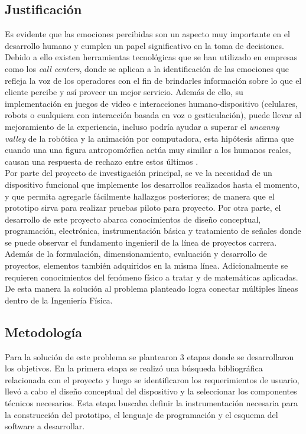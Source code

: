 \documentclass[11pt,lettersize]{article} %
\begin{document}
\subsection{Justificación}
Es evidente que las emociones percibidas son un aspecto muy importante en el desarrollo humano y cumplen un papel significativo en la toma de decisiones. Debido a ello existen herramientas tecnológicas que se han utilizado en empresas como los \textit{call centers}, donde se aplican a la identificación de las emociones que refleja la voz de los operadores con el fin de brindarles información sobre lo que el cliente percibe y así proveer un mejor servicio. Además de ello, su implementación en juegos de video e interacciones humano-dispositivo (celulares, robots o cualquiera con interacción basada en voz o gesticulación), puede llevar al mejoramiento de la experiencia, incluso podría ayudar a superar el \textit{uncanny valley} de la robótica y la animación por computadora, esta hipótesis afirma que cuando una una figura antropomórfica actúa muy similar a los humanos reales, causan una respuesta de rechazo entre estos últimos \cite{Woods2004}. \\

Por parte del proyecto de investigación principal, se ve la necesidad de un dispositivo funcional que implemente los desarrollos realizados hasta el momento, y que permita agregarle fácilmente hallazgos posteriores; de manera que el prototipo sirva para realizar pruebas piloto para proyecto. Por otra parte, el desarrollo de este proyecto abarca conocimientos de diseño conceptual, programación, electrónica,  instrumentación básica y tratamiento de señales donde se puede observar el fundamento ingenieril de la línea de proyectos carrera. Además de la formulación, dimensionamiento, evaluación y desarrollo de proyectos, elementos también adquiridos en la misma línea. Adicionalmente se requieren conocimientos del fenómeno físico a tratar y de matemáticas aplicadas. De esta manera la solución al problema planteado logra conectar múltiples líneas dentro de la Ingeniería Física.

\subsection{Metodología}
Para la solución de este problema se plantearon 3 etapas donde se desarrollaron los objetivos. En la primera etapa se realizó una búsqueda bibliográfica relacionada con el proyecto y luego se identificaron los requerimientos de usuario, llevó a cabo el diseño conceptual del dispositivo y la seleccionar los componentes técnicos necesarios. Esta etapa buscaba definir la instrumentación necesaria para la construcción del prototipo, el lenguaje de programación y el esquema del software a desarrollar. \\
\end{document}
